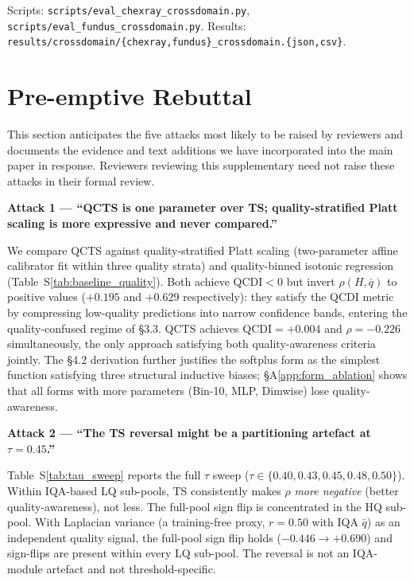 \documentclass{bmvc2k}
\newcommand{\qbar}{\bar{q}}
\begin{document}
Scripts: \texttt{scripts/eval\_chexray\_crossdomain.py}, \texttt{scripts/eval\_fundus\_crossdomain.py}.
Results: \texttt{results/crossdomain/\{chexray,fundus\}\_crossdomain.\{json,csv\}}.

\section{Pre-emptive Rebuttal}
\label{app:rebuttal}

This section anticipates the five attacks most likely to be raised by reviewers and documents the evidence and text additions we have incorporated into the main paper in response. Reviewers reviewing this supplementary need not raise these attacks in their formal review.

\textbf{Attack 1 — ``QCTS is one parameter over TS; quality-stratified Platt scaling is more expressive and never compared.''}

We compare QCTS against quality-stratified Platt scaling (two-parameter affine calibrator fit within three quality strata) and quality-binned isotonic regression (Table~S\ref{tab:baseline_quality}). Both achieve QCDI${<}0$ but invert $\rho(H,\qbar)$ to positive values ($+0.195$ and $+0.629$ respectively): they satisfy the QCDI metric by compressing low-quality predictions into narrow confidence bands, entering the quality-confused regime of \S3.3. QCTS achieves QCDI${=}{+}0.004$ and $\rho{=}{-}0.226$ simultaneously, the only approach satisfying both quality-awareness criteria jointly. The §4.2 derivation further justifies the softplus form as the simplest function satisfying three structural inductive biases; §A\ref{app:form_ablation} shows that all forms with more parameters (Bin-10, MLP, Dimwise) lose quality-awareness.

\textbf{Attack 2 — ``The TS reversal might be a partitioning artefact at $\tau{=}0.45$.''}

Table~S\ref{tab:tau_sweep} reports the full $\tau$ sweep ($\tau \in \{0.40, 0.43, 0.45, 0.48, 0.50\}$). Within IQA-based LQ sub-pools, TS consistently makes $\rho$ \emph{more negative} (better quality-awareness), not less. The full-pool sign flip is concentrated in the HQ sub-pool. With Laplacian variance (a training-free proxy, $r{=}0.50$ with IQA $\qbar$) as an independent quality signal, the full-pool sign flip holds ($-0.446 \to +0.690$) and sign-flips are present within every LQ sub-pool. The reversal is not an IQA-module artefact and not threshold-specific.
\end{document}
